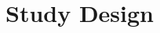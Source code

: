 \documentclass[conference]{IEEEtran}
\begin{document}




\section{Study Design}
\label{sec:study}

\end{document}
